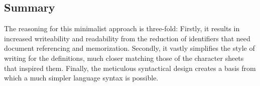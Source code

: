 \subsection{Summary}

The reasoning for this minimalist approach is three-fold: Firstly, it results in increased writeability and readability from the reduction of identifiers that need document referencing and memorization. Secondly, it vastly simplifies the style of writing for the definitions, much closer matching those of the character sheets that inspired them. Finally, the meticulous syntactical design creates a basis from which a much simpler language syntax is possible.%
